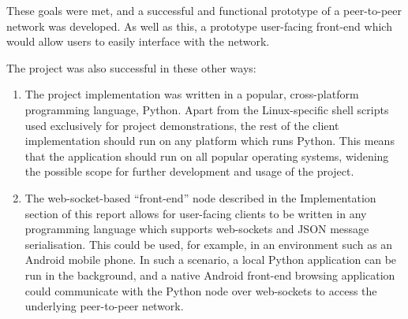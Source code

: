 These goals were met, and a successful and functional prototype of a peer-to-peer
network was developed. As well as this, a prototype user-facing front-end which would allow
users to easily interface with the network.

The project was also successful in these other ways:

\begin{enumerate}
	\item { The project implementation was written in a popular, cross-platform programming
	language, Python. Apart from the Linux-specific shell scripts used exclusively for
	project demonstrations, the rest of the client implementation should run on any platform
	which runs Python. This means that the application should run on all popular operating systems,
	widening the possible scope for further development and usage of the project.
	}

	\item{ The web-socket-based ``front-end'' node described in the Implementation section of
	this report allows for user-facing clients to be written in any programming language
	which supports web-sockets and JSON message serialisation.
	This could be used, for example, in an environment such as an Android mobile phone. 
	In such a scenario,  a local Python application can be run
	in the background, and a native Android front-end browsing application could communicate with
	the Python node over web-sockets to access the underlying peer-to-peer network.
	}
\end{enumerate}